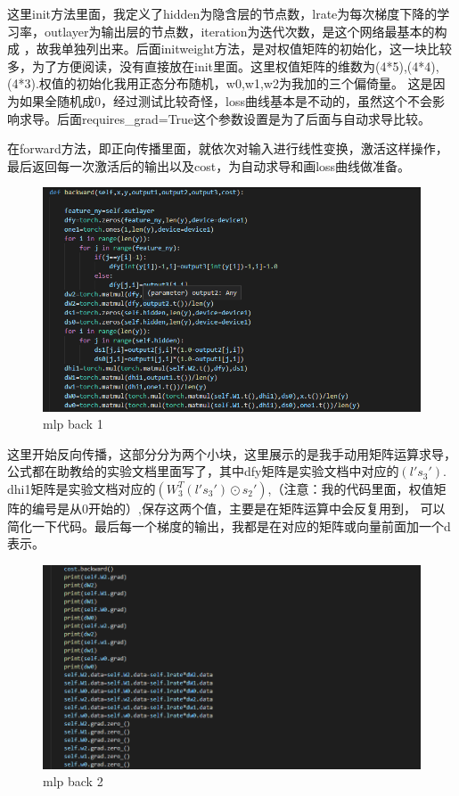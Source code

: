 \documentclass{report}
\begin{document}
    这里init方法里面，我定义了hidden为隐含层的节点数，lrate为每次梯度下降的学习率，outlayer为输出层的节点数，iteration为迭代次数，是这个网络最基本的构成
    ，故我单独列出来。后面initweight方法，是对权值矩阵的初始化，这一块比较多，为了方便阅读，没有直接放在init里面。这里权值矩阵的维数为(4*5),(4*4),(4*3).权值的初始化我用正态分布随机，w0,w1,w2为我加的三个偏倚量。
    这是因为如果全随机成0，经过测试比较奇怪，loss曲线基本是不动的，虽然这个不会影响求导。后面requires\_grad=True这个参数设置是为了后面与自动求导比较。\par 
    在forward方法，即正向传播里面，就依次对输入进行线性变换，激活这样操作，最后返回每一次激活后的输出以及cost，为自动求导和画loss曲线做准备。
    \begin{figure}[H]
        \centering
        \includegraphics[width=15cm]{9.png}
        \caption{mlp back 1}
    \end{figure}
    这里开始反向传播，这部分分为两个小块，这里展示的是我手动用矩阵运算求导，公式都在助教给的实验文档里面写了，其中dfy矩阵是实验文档中对应的$(l's_3')$.
    dhi1矩阵是实验文档对应的$(W_3^T(l's_3')\odot s_2')$,（注意：我的代码里面，权值矩阵的编号是从0开始的）,保存这两个值，主要是在矩阵运算中会反复用到，
    可以简化一下代码。最后每一个梯度的输出，我都是在对应的矩阵或向量前面加一个d表示。\par 
    \begin{figure}[H]
        \centering
        \includegraphics[width=15cm]{10.png}
        \caption{mlp back 2}
    \end{figure}
\end{document}
